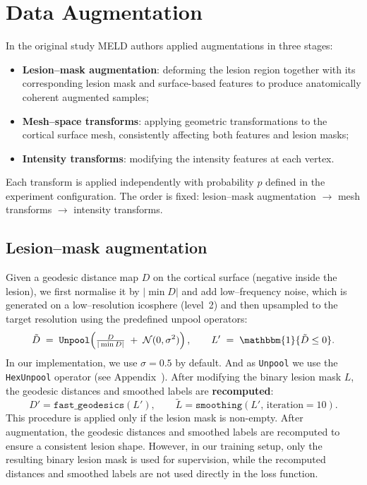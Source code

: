 \documentclass[FCD_GNN.tex]{subfiles}
\begin{document}
\section{Data Augmentation}
In the original study MELD authors applied augmentations in three stages: 
\begin{itemize}
    \item \textbf{Lesion--mask augmentation}: deforming the lesion region together with its corresponding lesion mask and surface-based features to produce anatomically coherent augmented samples;
    \item \textbf{Mesh--space transforms}: applying geometric transformations to the cortical surface mesh, consistently affecting both features and lesion masks;
    \item \textbf{Intensity transforms}: modifying the intensity features at each vertex.
\end{itemize}
Each transform is applied independently with probability $p$ defined in the experiment configuration. 
The order is fixed: lesion--mask augmentation $\rightarrow$ mesh transforms $\rightarrow$ intensity transforms.

\subsection*{Lesion--mask augmentation}
Given a geodesic distance map $D$ on the cortical surface (negative inside the lesion),
we first normalise it by $|\min D|$ and add low–frequency noise, which is generated on a low–resolution icosphere (level~2) and then upsampled to the target resolution using the predefined unpool operators:
\[
\tilde{D} \;=\; \texttt{Unpool}\!\left(\tfrac{D}{|\min D|} \;+\; \mathcal{N}(0,\sigma^2)\right), 
\qquad
L' \;=\; \mathbbm{1}\{\tilde{D}\le 0\}.
\]
In our implementation, we use $\sigma = 0.5$ by default. And as \texttt{Unpool} we use the \texttt{HexUnpool} operator (see Appendix~).
After modifying the binary lesion mask $L$, the geodesic distances and smoothed labels are 
\textbf{recomputed}:
\[
D'=\texttt{fast\_geodesics}(L'), 
\qquad
\widetilde{L}=\texttt{smoothing}(L',\,\text{iteration}=10).
\]
This procedure is applied only if the lesion mask is non-empty.  
After augmentation, the geodesic distances and smoothed labels are recomputed to ensure a consistent lesion shape. 
However, in our training setup, only the resulting binary lesion mask is used for supervision, 
while the recomputed distances and smoothed labels are not used directly in the loss function.
\end{document}
